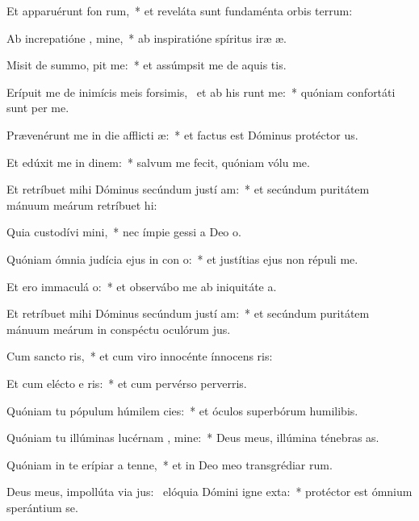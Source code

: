 \item Et apparuérunt fon rum,~* et reveláta sunt fundaménta orbis terrum:
\item Ab increpatióne , mine,~* ab inspiratióne spíritus iræ æ.
\item Misit de summo,  pit me:~* et assúmpsit me de aquis tis.
\item Erípuit me de inimícis meis forsimis,~\pscross{} et ab his  runt me:~* quóniam confortáti sunt per me.
\item Prævenérunt me in die afflicti æ:~* et factus est Dóminus protéctor us.
\item Et edúxit me in dinem:~* salvum me fecit, quóniam vólu me.
\item Et retríbuet mihi Dóminus secúndum justí am:~* et secúndum puritátem mánuum meárum retríbuet hi:
\item Quia custodívi  mini,~* nec ímpie gessi a Deo o.
\item Quóniam ómnia judícia ejus in con o:~* et justítias ejus non répuli  me.
\item Et ero immaculá  o:~* et observábo me ab iniquitáte a.
\item Et retríbuet mihi Dóminus secúndum justí am:~* et secúndum puritátem mánuum meárum in conspéctu oculórum jus.
\item Cum sancto  ris,~* et cum viro innocénte ínnocens ris:
\item Et cum elécto e ris:~* et cum pervérso perverris.
\item Quóniam tu pópulum húmilem  cies:~* et óculos superbórum humilibis.
\item Quóniam tu illúminas lucérnam , mine:~* Deus meus, illúmina ténebras as.
\item Quóniam in te erípiar a tenne,~* et in Deo meo transgrédiar rum.
\item Deus meus, impollúta via jus:~\pscross{} elóquia Dómini igne exta:~* protéctor est ómnium sperántium  se.
